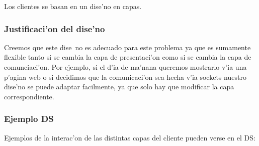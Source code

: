 Los clientes se basan en un dise'no en capas.

\subsubsection{Justificaci'on del dise'no}
Creemos que este dise~no es adecuado para este problema ya que es sumamente flexible tanto si se cambia la capa de presentaci'on como si se cambia la capa de comunciaci'on. Por ejemplo, si el d'ia de ma'nana queremos mostrarlo v'ia una p'agina web o si decidimos que la comunicaci'on sea hecha v'ia sockets nuestro dise'no se puede adaptar facilmente, ya que solo hay que modificar la capa correspondiente.

\subsubsection{Ejemplo DS}
Ejemplos de la interac'on de las distintas capas del cliente pueden verse en el DS:

\tam
